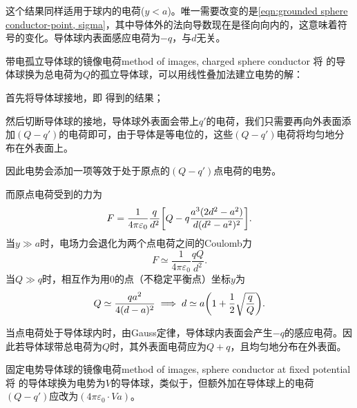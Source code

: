\begin{remark}
    这个结果同样适用于球内的电荷($y<a$)。唯一需要改变的是\eqref{eqn:grounded sphere conductor-point, sigma}，其中导体外的法向导数现在是径向向内的，这意味着符号的变化。导体球内表面感应电荷为$-q$，与$d$无关。
\end{remark}

\begin{example}{带电孤立导体球的镜像电荷}{method of images, charged sphere conductor}
    将 的导体球换为总电荷为$Q$的孤立导体球，可以用线性叠加法建立电势的解：
    \begin{compactenum}
        \item 首先将导体球接地，即 得到的结果；
        \item 然后切断导体球的接地，导体球外表面会带上$q'$的电荷，我们只需要再向外表面添加$(Q-q')$的电荷即可，由于导体是等电位的，这些$(Q-q')$电荷将均匀地分布在外表面上。
    \end{compactenum}
    因此电势会添加一项等效于处于原点的$(Q-q')$点电荷的电势。
    
    而原点电荷受到的力为
    \begin{equation}
        F=\frac1{4\pi\varepsilon_0}\frac q{d^2}\biggl[Q-q\frac{a^3(2d^2-a^2)}{d(d^2-a^2)^2}\biggr].
    \end{equation}
    当$y\gg a$时，电场力会退化为两个点电荷之间的Coulomb力
    \[
        F\simeq\frac1{4\pi\varepsilon_0}\frac{qQ}{d^2}.
    \]
    当$Q\gg q$时，相互作为用0的点（不稳定平衡点）坐标$y$为
    \begin{equation}
        Q\simeq\frac{qa^2}{4(d-a)^2}\implies d\simeq a\biggl(1+\frac12\sqrt{\frac qQ}\biggr).
    \end{equation}
\end{example}
\begin{remark}
    当点电荷处于导体球内时，由Gauss定律，导体球内表面会产生$-q$的感应电荷。因此若导体球带总电荷为$Q$时，其外表面电荷应为$Q+q$，且均匀地分布在外表面。
\end{remark}
\begin{example}{固定电势导体球的镜像电荷}{method of images, sphere conductor at fixed potential}
    将 的导体球换为电势为$V$的导体球，类似于，但额外加在导体球上的电荷$(Q-q')$应改为$(4\pi\varepsilon_0\cdot Va)$。
\end{example}
